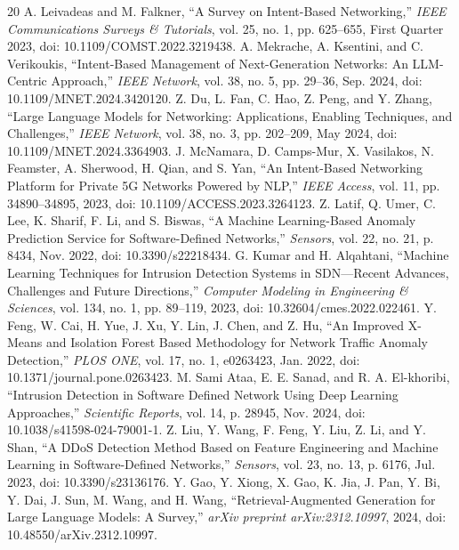 \documentclass[conference]{IEEEtran}
\begin{document}
\footnotesize
\begin{thebibliography}{20}
\setlength{\itemsep}{0pt plus 0.3pt}
 A. Leivadeas and M. Falkner, ``A Survey on Intent-Based Networking,'' \textit{IEEE Communications Surveys \& Tutorials}, vol. 25, no. 1, pp. 625--655, First Quarter 2023, doi: 10.1109/COMST.2022.3219438.
 A. Mekrache, A. Ksentini, and C. Verikoukis, ``Intent-Based Management of Next-Generation Networks: An LLM-Centric Approach,'' \textit{IEEE Network}, vol. 38, no. 5, pp. 29--36, Sep. 2024, doi: 10.1109/MNET.2024.3420120.
 Z. Du, L. Fan, C. Hao, Z. Peng, and Y. Zhang, ``Large Language Models for Networking: Applications, Enabling Techniques, and Challenges,'' \textit{IEEE Network}, vol. 38, no. 3, pp. 202--209, May 2024, doi: 10.1109/MNET.2024.3364903.
 J. McNamara, D. Camps-Mur, X. Vasilakos, N. Feamster, A. Sherwood, H. Qian, and S. Yan, ``An Intent-Based Networking Platform for Private 5G Networks Powered by NLP,'' \textit{IEEE Access}, vol. 11, pp. 34890--34895, 2023, doi: 10.1109/ACCESS.2023.3264123.
 Z. Latif, Q. Umer, C. Lee, K. Sharif, F. Li, and S. Biswas, ``A Machine Learning-Based Anomaly Prediction Service for Software-Defined Networks,'' \textit{Sensors}, vol. 22, no. 21, p. 8434, Nov. 2022, doi: 10.3390/s22218434.
 G. Kumar and H. Alqahtani, ``Machine Learning Techniques for Intrusion Detection Systems in SDN---Recent Advances, Challenges and Future Directions,'' \textit{Computer Modeling in Engineering \& Sciences}, vol. 134, no. 1, pp. 89--119, 2023, doi: 10.32604/cmes.2022.022461.
 Y. Feng, W. Cai, H. Yue, J. Xu, Y. Lin, J. Chen, and Z. Hu, ``An Improved X-Means and Isolation Forest Based Methodology for Network Traffic Anomaly Detection,'' \textit{PLOS ONE}, vol. 17, no. 1, e0263423, Jan. 2022, doi: 10.1371/journal.pone.0263423.
 M. Sami Ataa, E. E. Sanad, and R. A. El-khoribi, ``Intrusion Detection in Software Defined Network Using Deep Learning Approaches,'' \textit{Scientific Reports}, vol. 14, p. 28945, Nov. 2024, doi: 10.1038/s41598-024-79001-1.
 Z. Liu, Y. Wang, F. Feng, Y. Liu, Z. Li, and Y. Shan, ``A DDoS Detection Method Based on Feature Engineering and Machine Learning in Software-Defined Networks,'' \textit{Sensors}, vol. 23, no. 13, p. 6176, Jul. 2023, doi: 10.3390/s23136176.
 Y. Gao, Y. Xiong, X. Gao, K. Jia, J. Pan, Y. Bi, Y. Dai, J. Sun, M. Wang, and H. Wang, ``Retrieval-Augmented Generation for Large Language Models: A Survey,'' \textit{arXiv preprint arXiv:2312.10997}, 2024, doi: 10.48550/arXiv.2312.10997.

\end{thebibliography}
\end{document}
